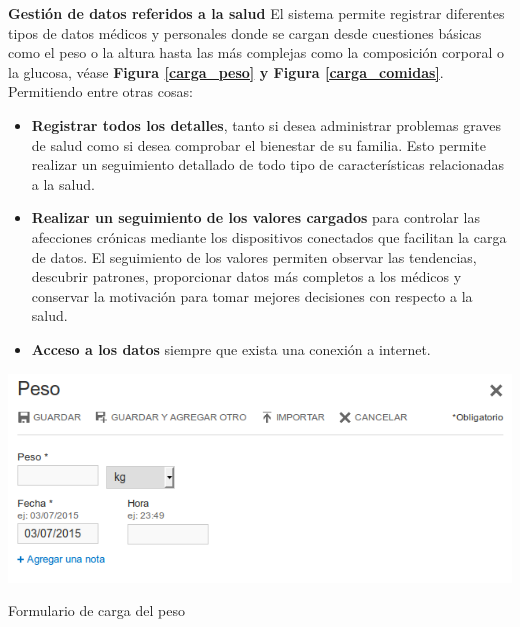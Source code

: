 \begin{itemize}
 {\correccionTexto
\item \textbf{Gestión de datos referidos a la salud}
	El sistema permite registrar diferentes tipos de datos médicos y personales donde se cargan desde cuestiones básicas como el peso o la altura hasta las más complejas como la composición corporal o la glucosa, véase \textbf{Figura \ref{carga_peso} y Figura \ref{carga_comidas}}.  Permitiendo entre otras cosas:
    \begin{itemize}
		\item \textbf{Registrar todos los detalles}, tanto si desea administrar problemas graves de salud como si desea comprobar el bienestar de su familia. Esto permite realizar un seguimiento detallado de todo tipo de características relacionadas a la salud.
        \item \textbf{Realizar un seguimiento de los valores cargados} para controlar las afecciones crónicas mediante los dispositivos conectados que facilitan la carga de datos. El seguimiento de los valores permiten observar las tendencias, descubrir patrones, proporcionar datos más completos a los médicos y conservar la motivación para tomar mejores decisiones con respecto a la salud.
        \item \textbf{Acceso a los datos} siempre que exista una conexión a internet.
	\end{itemize}
 
 	\begin{correccionFigure}[h]
      \centering
      \includegraphics[width=.8\textwidth]{img/tp1/3-carga_peso}
      \caption{Formulario de carga del peso}
      \label{carga_peso}
    \end{correccionFigure}   
    
}
\end{itemize}
